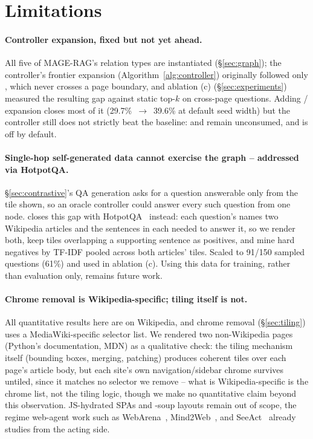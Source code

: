 \section{Limitations}
\label{sec:limitations}

\paragraph{Controller expansion, fixed but not yet ahead.} All five of MAGE-RAG's relation types are instantiated (\S\ref{sec:graph}); the controller's frontier expansion (Algorithm~\ref{alg:controller}) originally followed only , which never crosses a page boundary, and ablation (c) (\S\ref{sec:experiments}) measured the resulting gap against static top-$k$ on cross-page questions. Adding / expansion closes most of it (29.7\%~$\to$~39.6\% at default seed width) but the controller still does not strictly beat the baseline:  and  remain unconsumed, and  is off by default.

\paragraph{Single-hop self-generated data cannot exercise the graph -- addressed via HotpotQA.} \S\ref{sec:contrastive}'s QA generation asks for a question answerable only from the tile shown, so an oracle controller could answer every such question from one node.  closes this gap with HotpotQA~\citep{hotpotqa2018} instead: each question's  names two Wikipedia articles and the sentences in each needed to answer it, so we render both, keep tiles overlapping a supporting sentence as positives, and mine hard negatives by TF-IDF pooled across both articles' tiles. Scaled to 91/150 sampled questions (61\%) and used in ablation (c). Using this data for training, rather than evaluation only, remains future work.

\paragraph{Chrome removal is Wikipedia-specific; tiling itself is not.} All quantitative results here are on Wikipedia, and chrome removal (\S\ref{sec:tiling}) uses a MediaWiki-specific selector list. We rendered two non-Wikipedia pages (Python's documentation, MDN) as a qualitative check: the tiling mechanism itself (bounding boxes, merging, patching) produces coherent tiles over each page's article body, but each site's own navigation/sidebar chrome survives untiled, since it matches no selector we remove -- what is Wikipedia-specific is the chrome list, not the tiling logic, though we make no quantitative claim beyond this observation. JS-hydrated SPAs and -soup layouts remain out of scope, the regime web-agent work such as WebArena~\citep{webarena2023}, Mind2Web~\citep{mind2web2023}, and SeeAct~\citep{seeact2024} already studies from the acting side.

